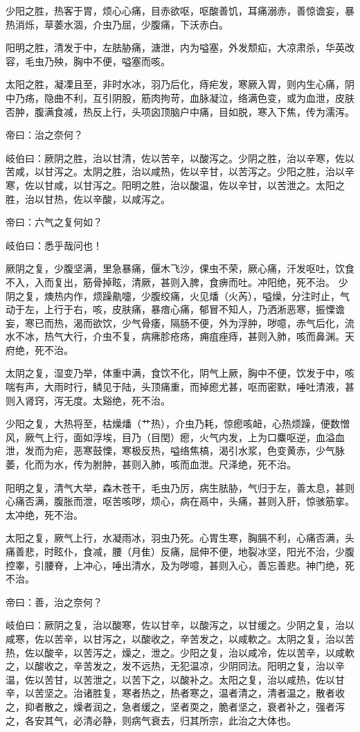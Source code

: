 \documentclass{article}%
\begin{document}
少阳之胜，热客于胃，烦心心痛，目赤欲呕，呕酸善饥，耳痛溺赤，善惊谵妄，暴热消烁，草萎水涸，介虫乃屈，少腹痛，下沃赤白。

阳明之胜，清发于中，左胠胁痛，溏泄，内为嗌塞，外发颓疝，大凉肃杀，华英改容，毛虫乃殃，胸中不便，嗌塞而咳。

太阳之胜，凝凓且至，非时水冰，羽乃后化，痔疟发，寒厥入胃，则内生心痛，阴中乃疡，隐曲不利，互引阴股，筋肉拘苛，血脉凝泣，络满色变，或为血泄，皮肤否肿，腹满食减，热反上行，头项囟顶脑户中痛，目如脱，寒入下焦，传为濡泻。

帝曰：治之奈何？

岐伯曰：厥阴之胜，治以甘清，佐以苦辛，以酸泻之。少阴之胜，治以辛寒，佐以苦咸，以甘泻之。太阴之胜，治以咸热，佐以辛甘，以苦泻之。少阳之胜，治以辛寒，佐以甘咸，以甘泻之。阳明之胜，治以酸温，佐以辛甘，以苦泄之。太阳之胜，治以甘热，佐以辛酸，以咸泻之。

帝曰：六气之复何如？

岐伯曰：悉乎哉问也！

厥阴之复，少腹坚满，里急暴痛，偃木飞沙，倮虫不荣，厥心痛，汗发呕吐，饮食不入，入而复出，筋骨掉眩，清厥，甚则入脾，食痹而吐。冲阳绝，死不治。 少阴之复，燠热内作，烦躁鼽嚏，少腹绞痛，火见燔（火芮），嗌燥，分注时止，气动于左，上行于右，咳，皮肤痛，暴瘖心痛，郁冒不知人，乃洒淅恶寒，振慄谵妄，寒已而热，渴而欲饮，少气骨痿，隔肠不便，外为浮肿，哕噫，赤气后化，流水不冰，热气大行，介虫不复，病疿胗疮疡，痈疽痤痔，甚则入肺，咳而鼻渊。天府绝，死不治。

太阴之复，湿变乃举，体重中满，食饮不化，阴气上厥，胸中不便，饮发于中，咳喘有声，大雨时行，鳞见于陆，头顶痛重，而掉瘛尤甚，呕而密默，唾吐清液，甚则入肾窍，泻无度。太谿绝，死不治。

少阳之复，大热将至，枯燥燔（艹热），介虫乃耗，惊瘛咳衄，心热烦躁，便数憎风，厥气上行，面如浮埃，目乃（目閏）瘛，火气内发，上为口麋呕逆，血溢血泄，发而为疟，恶寒鼓慄，寒极反热，嗌络焦槁，渴引水浆，色变黄赤，少气脉萎，化而为水，传为胕肿，甚则入肺，咳而血泄。尺泽绝，死不治。

阳明之复，清气大举，森木苍干，毛虫乃厉，病生胠胁，气归于左，善太息，甚则心痛否满，腹胀而泄，呕苦咳哕，烦心，病在鬲中，头痛，甚则入肝，惊骇筋挛。太冲绝，死不治。

太阳之复，厥气上行，水凝雨冰，羽虫乃死。心胃生寒，胸膈不利，心痛否满，头痛善悲，时眩仆，食减，腰（月隹）反痛，屈伸不便，地裂冰坚，阳光不治，少腹控睾，引腰脊，上冲心，唾出清水，及为哕噫，甚则入心，善忘善悲。神门绝，死不治。

帝曰：善，治之奈何？

岐伯曰：厥阴之复，治以酸寒，佐以甘辛，以酸泻之，以甘缓之。少阴之复，治以咸寒，佐以苦辛，以甘泻之，以酸收之，辛苦发之，以咸軟之。太阴之复，治以苦热，佐以酸辛，以苦泻之，燥之，泄之。少阳之复，治以咸冷，佐以苦辛，以咸軟之，以酸收之，辛苦发之，发不远热，无犯温凉，少阴同法。阳明之复，治以辛温，佐以苦甘，以苦泄之，以苦下之，以酸补之。太阳之复，治以咸热，佐以甘辛，以苦坚之。治诸胜复，寒者热之，热者寒之，温者清之，清者温之，散者收之，抑者散之，燥者润之，急者缓之，坚者耎之，脆者坚之，衰者补之，强者泻之，各安其气，必清必静，则病气衰去，归其所宗，此治之大体也。
\end{document}
